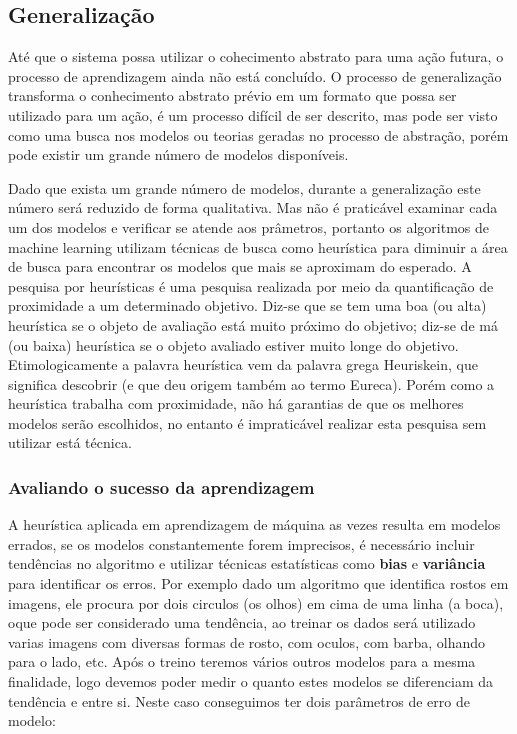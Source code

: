 \subsection{Generalização}
\label{cap:generalização-dados}

Até que o sistema possa utilizar o cohecimento abstrato para uma ação futura, o processo de aprendizagem ainda não está concluído.
O processo de generalização transforma o conhecimento abstrato prévio em um formato que possa ser utilizado para um ação, é um 
processo difícil de ser descrito, mas pode ser visto como uma busca nos modelos ou teorias geradas no processo de abstração, porém pode existir
um grande número de modelos disponíveis.

Dado que exista um grande número de modelos, durante a generalização este número será reduzido de forma qualitativa. 
Mas não é praticável examinar cada um dos modelos e verificar se atende aos prâmetros, portanto os algoritmos de machine learning utilizam 
técnicas de busca como heurística para diminuir a área de busca para encontrar os modelos que mais se aproximam do esperado. \cite{heuristica}A pesquisa por heurísticas é uma pesquisa 
realizada por meio da quantificação de proximidade a um determinado objetivo. Diz-se que se tem uma boa (ou alta) heurística se o objeto de avaliação está muito 
próximo do objetivo; diz-se de má (ou baixa) heurística se o objeto avaliado estiver muito longe do objetivo. 
Etimologicamente a palavra heurística vem da palavra grega Heuriskein, que significa descobrir (e que deu origem também ao termo Eureca). 
Porém como a heurística trabalha com proximidade, não há garantias de que os melhores modelos serão escolhidos, 
no entanto é impraticável realizar esta pesquisa sem utilizar está técnica.

\subsubsection{Avaliando o sucesso da aprendizagem}
\label{cap:avaliando-generalização-dados}

A heurística aplicada em aprendizagem de máquina as vezes resulta em modelos errados, se os modelos constantemente 
forem imprecisos, é necessário incluir tendências no algoritmo e utilizar técnicas estatísticas como \textbf{bias} e \textbf{variância} para identificar os erros.
Por exemplo dado um algoritmo que identifica rostos em imagens, ele procura por dois circulos (os olhos) em cima de uma linha (a boca), oque pode 
ser considerado uma tendência, ao treinar os dados será utilizado varias imagens com diversas formas de rosto, com oculos, com barba, olhando para o lado, etc.
Após o treino teremos vários outros modelos para a mesma finalidade, logo devemos poder medir o quanto estes modelos 
se diferenciam da tendência e entre si. Neste caso conseguimos ter dois parâmetros de erro de modelo:

